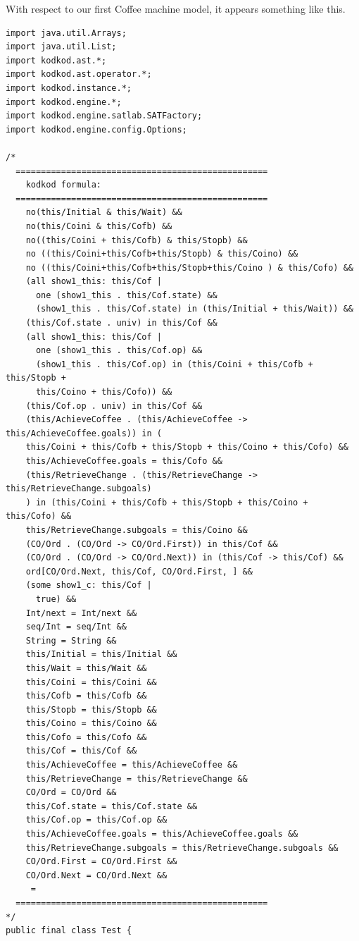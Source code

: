 \documentclass[a4paper,12pt]{report}
\begin{document}
\begin{onehalfspacing}
With respect to our first Coffee machine model, it appears something like this.
\begin{verbatim}
import java.util.Arrays;
import java.util.List;
import kodkod.ast.*;
import kodkod.ast.operator.*;
import kodkod.instance.*;
import kodkod.engine.*;
import kodkod.engine.satlab.SATFactory;
import kodkod.engine.config.Options;

/* 
  ==================================================
    kodkod formula: 
  ==================================================
    no(this/Initial & this/Wait) && 
    no(this/Coini & this/Cofb) && 
    no((this/Coini + this/Cofb) & this/Stopb) && 
    no ((this/Coini+this/Cofb+this/Stopb) & this/Coino) && 
    no ((this/Coini+this/Cofb+this/Stopb+this/Coino ) & this/Cofo) && 
    (all show1_this: this/Cof | 
      one (show1_this . this/Cof.state) && 
      (show1_this . this/Cof.state) in (this/Initial + this/Wait)) && 
    (this/Cof.state . univ) in this/Cof && 
    (all show1_this: this/Cof | 
      one (show1_this . this/Cof.op) && 
      (show1_this . this/Cof.op) in (this/Coini + this/Cofb + this/Stopb + 
      this/Coino + this/Cofo)) && 
    (this/Cof.op . univ) in this/Cof && 
    (this/AchieveCoffee . (this/AchieveCoffee -> this/AchieveCoffee.goals)) in (
    this/Coini + this/Cofb + this/Stopb + this/Coino + this/Cofo) && 
    this/AchieveCoffee.goals = this/Cofo && 
    (this/RetrieveChange . (this/RetrieveChange -> this/RetrieveChange.subgoals)
    ) in (this/Coini + this/Cofb + this/Stopb + this/Coino + this/Cofo) && 
    this/RetrieveChange.subgoals = this/Coino && 
    (CO/Ord . (CO/Ord -> CO/Ord.First)) in this/Cof && 
    (CO/Ord . (CO/Ord -> CO/Ord.Next)) in (this/Cof -> this/Cof) && 
    ord[CO/Ord.Next, this/Cof, CO/Ord.First, ] && 
    (some show1_c: this/Cof | 
      true) && 
    Int/next = Int/next && 
    seq/Int = seq/Int && 
    String = String && 
    this/Initial = this/Initial && 
    this/Wait = this/Wait && 
    this/Coini = this/Coini && 
    this/Cofb = this/Cofb && 
    this/Stopb = this/Stopb && 
    this/Coino = this/Coino && 
    this/Cofo = this/Cofo && 
    this/Cof = this/Cof && 
    this/AchieveCoffee = this/AchieveCoffee && 
    this/RetrieveChange = this/RetrieveChange && 
    CO/Ord = CO/Ord && 
    this/Cof.state = this/Cof.state && 
    this/Cof.op = this/Cof.op && 
    this/AchieveCoffee.goals = this/AchieveCoffee.goals && 
    this/RetrieveChange.subgoals = this/RetrieveChange.subgoals && 
    CO/Ord.First = CO/Ord.First && 
    CO/Ord.Next = CO/Ord.Next && 
     = 
  ==================================================
*/
public final class Test {


\end{verbatim}
\end{onehalfspacing}
\end{document}
